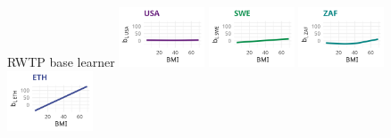 \documentclass[t,10pt]{beamer}
\begin{document}
\begin{frame}{RWTP base learner}
  {\includegraphics[width=0.19\textwidth]{figures/bs-tensor/fig-tensor-USA.png}}
  {\includegraphics[width=0.19\textwidth]{figures/bs-tensor/fig-tensor-SWE.png}}
  \includegraphics[width=0.19\textwidth]{figures/bs-tensor/fig-tensor-ZAF.png}
  {\includegraphics[width=0.19\textwidth]{figures/bs-tensor/fig-tensor-ETH.png}}
  \addtocounter{framenumber}{-1}
\end{frame}
\end{document}
